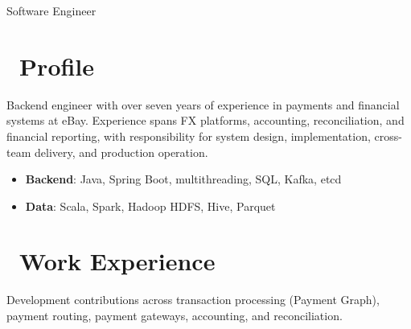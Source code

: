 \documentclass{resume}
\begin{document}

\centerline{Software Engineer}
\vspace{2ex}

\section{\faCogs\ Profile}
Backend engineer with over seven years of experience in payments and financial systems at eBay. Experience spans FX platforms, accounting, reconciliation, and financial reporting, with responsibility for system design, implementation, cross-team delivery, and production operation.
\begin{itemize}[parsep=0.5ex]
  \item \textbf{Backend}: Java, Spring Boot, multithreading, SQL, Kafka, etcd
  \item \textbf{Data}: Scala, Spark, Hadoop HDFS, Hive, Parquet
\end{itemize}

\section{\faUsers\ Work Experience}
Development contributions across transaction processing (Payment Graph), payment routing, payment gateways, accounting, and reconciliation.
\end{document}
